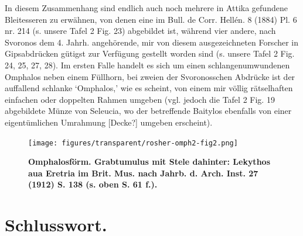 \documentclass[a4paper, 11pt, oneside]{article}
\begin{document}
In diesem Zusammenhang sind endlich auch noch mehrere in Attika gefundene Bleitesseren zu erwähnen, von denen eine im Bull. de Corr. Hellén. 8 (1884) Pl. 6 nr. 214 (s. unsere Tafel 2 Fig. 23) abgebildet ist, während vier andere, nach Svoronos dem 4. Jahrh. angehörende, mir von diesem ausgezeichneten Forscher in Gipsabdrücken gütigst zur Verfügung gestellt worden sind (s. unsere Tafel 2 Fig. 24, 25, 27, 28). Im ersten Falle handelt es sich um einen schlangenumwundenen Omphalos neben einem Füllhorn, bei zweien der Svoronosschen Abdrücke ist der auffallend schlanke `Omphalos,' wie es scheint, von einem mir völlig rätselhaften einfachen oder doppelten Rahmen umgeben (vgl. jedoch die Tafel 2 Fig. 19 abgebildete Münze von Seleucia, wo der betreffende Baitylos ebenfalls von einer eigentümlichen Umrahmung [Decke?] umgeben erscheint).
\begin{figure}[H]
\centering
\texttt{[image: figures/transparent/rosher-omph2-fig2.png]}
\caption{\bfseries Omphalosförm. Grabtumulus mit Stele dahinter: Lekythos aua Eretria im Brit. Mus. nach Jahrb. d. Arch. Inst. 27 (1912) S. 138 (s. oben S. 61 f.).}
\end{figure}
\clearpage
\section{Schlusswort.}
\end{document}
